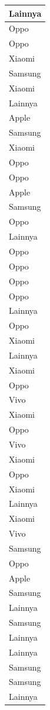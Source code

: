 \documentclass[
  letterpaper,
  DIV=11,
  numbers=noendperiod]{scrartcl}
\begin{document}
\begin{table}
\begin{tabular}[t]{l}
\hline
Lainnya\\
\hline
Oppo\\
\hline
Oppo\\
\hline
Xiaomi\\
\hline
Samsung\\
\hline
Xiaomi\\
\hline
Lainnya\\
\hline
Apple\\
\hline
Samsung\\
\hline
Xiaomi\\
\hline
Oppo\\
\hline
Oppo\\
\hline
Apple\\
\hline
Samsung\\
\hline
Oppo\\
\hline
Lainnya\\
\hline
Oppo\\
\hline
Oppo\\
\hline
Oppo\\
\hline
Oppo\\
\hline
Lainnya\\
\hline
Oppo\\
\hline
Xiaomi\\
\hline
Lainnya\\
\hline
Xiaomi\\
\hline
Oppo\\
\hline
Vivo\\
\hline
Xiaomi\\
\hline
Oppo\\
\hline
Vivo\\
\hline
Xiaomi\\
\hline
Oppo\\
\hline
Xiaomi\\
\hline
Lainnya\\
\hline
Xiaomi\\
\hline
Vivo\\
\hline
Samsung\\
\hline
Oppo\\
\hline
Apple\\
\hline
Samsung\\
\hline
Lainnya\\
\hline
Samsung\\
\hline
Lainnya\\
\hline
Lainnya\\
\hline
Samsung\\
\hline
Samsung\\
\hline
Lainnya\\

\end{tabular}
\end{table}
\end{document}
